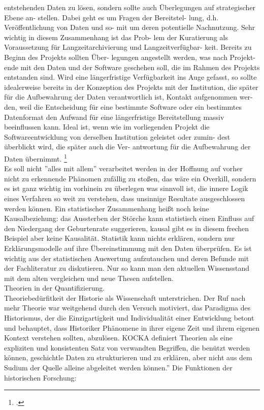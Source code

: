 \documentclass[12pt,a4paper]{article}
\begin{document}
entstehenden Daten zu lösen, sondern sollte 
auch Überlegungen auf strategischer Ebene an-
stellen. Dabei geht es um Fragen der Bereitstel-
lung, d.h. Veröffentlichung von Daten und so-
mit um deren potentielle Nachnutzung. Sehr 
wichtig in diesem Zusammenhang ist das Prob-
lem der Kuratierung als Voraussetzung für 
Langzeitarchivierung und Langzeitverfügbar-
keit. Bereits zu Beginn des Projekts sollten Über-
legungen angestellt werden, was nach Projekt-
ende mit den Daten und der Software geschehen 
soll, die im Rahmen des Projekts entstanden 
sind. Wird eine längerfristige Verfügbarkeit ins 
Auge gefasst, so sollte idealerweise bereits in 
der Konzeption des Projekts mit der Institution, 
die später für die Aufbewahrung der Daten 
verantwortlich ist, Kontakt aufgenommen wer-
den, weil die Entscheidung für eine bestimmte 
Software oder ein bestimmtes Datenformat den 
Aufwand für eine längerfristige Bereitstellung 
massiv beeinflussen kann. Ideal ist, wenn wie im 
vorliegenden Projekt die Softwareentwicklung 
von derselben Institution geleistet oder zumin-
dest überblickt wird, die später auch die Ver-
antwortung für die Aufbewahrung der Daten 
übernimmt. \footcite[][S.239-242]{vasold2015allerunderthenigsten}
\\
Es soll nicht ''alles mit allem'' verarbeitet werden in der Hoffnung auf vorher nicht zu erkennende Phänomen zufällig zu stoßen, das wäre ein Overkill, sondern es ist ganz wichtig im vorhinein zu überlegen was sinnvoll ist, die innere Logik eines Verfahren so weit zu verstehen, dass unsinnige Resultate ausgeschlossen werden können. Ein statistischer Zusammenhang heißt noch keine Kausalbeziehung: das Aussterben der Störche kann statistisch einen Einfluss auf den Niedergang der Geburtenrate suggerieren, kausal gibt es in diesem frechen Beispiel aber keine Kausalität. Statistik kann nichts erklären, sondern nur Erklärungsmodelle auf ihre Übereinstimmung mit den Daten überprüfen. Es ist wichtig aus der statistischen Auswertung aufzutauchen und deren Befunde mit der Fachliteratur zu diskutieren. Nur so kann man den aktuellen Wissensstand mit dem alten vergleichen und neue Thesen aufstellen.
\\
Theorien in der Quantifizierung.
\\
Theoriebedürfitkeit der Historie als Wissenschaft unterstrichen. Der Ruf nach mehr Theorie war weitgehend durch den Versuch motiviert, das Paradigma des Historismus, der die Einzigartigkeit und Individualität einer Entwicklung betont und behauptet, dass Historiker Phänomene in ihrer eigene Zeit und ihrem eigenen Kontext verstehen sollten, abzulösen. KOCKA definiert Theorien als eine expliziten und konsistenten Satz von verwandten Begriffen, die benützt werden können, geschichtle Daten zu strukturieren und zu erklären, aber nicht aus dem Sudium der Quelle alleine abgeleitet werden können.'' Die Funktionen der historischen Forschung:
\end{document}
